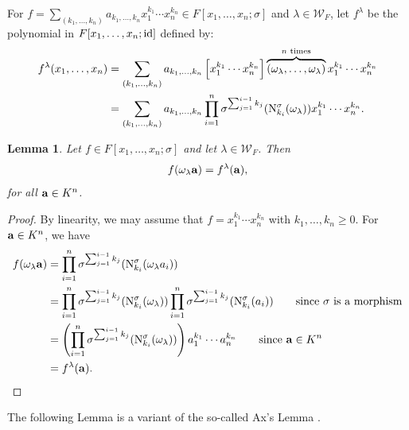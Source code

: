 \documentclass[11pt,reqno]{amsart}
\newtheorem{lem}[thm]{Lemma}
\theoremstyle{definition}
\begin{document}
\noindent
For $f=\sum_{(k_1,\dots,k_n)} a_{k_1,\dots,k_n}x_1^{k_1}\cdots x_n^{k_n} \in F[x_1,\dots,x_n;\sigma]$ and $\lambda \in \mathscr{W}_F$, let $f^\lambda$ be the polynomial in $F[x_1,\dots,x_n;{\rm id}]$ defined by:
\begin{align*}
f^{\lambda}(x_1,\dots,x_n)&=\sum_{(k_1,\dots,k_n)}a_{k_1,\dots,k_n}\left[x_1^{k_1}\cdots  x_n^{k_n}\right]\overbrace{\left(\omega_\lambda,\dots,\omega_\lambda\right)}^{n\,\,\textrm{times}}x_1^{k_1}\cdots  x_n^{k_n}\\
&=\sum_{(k_1,\dots,k_n)}a_{k_1,\dots,k_n}\prod_{i=1}^n \sigma^{\sum_{j=1}^{i-1}k_j}({\rm N}^\sigma_{k_i}(\omega_\lambda))x_1^{k_1}\cdots  x_n^{k_n}.
\end{align*}
\begin{lem}\label{lem:resttoflam}
Let $f \in F[x_1,\dots,x_n;\sigma]$ and let $\lambda \in \mathscr{W}_F$. Then 
$$
f(\omega_\lambda {\bf a})=f^{\lambda}({\bf a}),
$$ for all ${\bf a} \in K^n$.
\end{lem}
\begin{proof}
By linearity, we may assume that $f=x_1^{k_1}\cdots x_n^{k_n}$ with $k_1,\dots,k_n \geq 0$. For ${\bf a} \in K^n$, we have
\begin{align*}
f(\omega_\lambda {\bf a})&=\prod_{i=1}^n \sigma^{\sum_{j=1}^{i-1}k_j}({\rm N}^\sigma_{k_i}(\omega_\lambda a_i))\\
&=\prod_{i=1}^n \sigma^{\sum_{j=1}^{i-1}k_j}({\rm N}^\sigma_{k_i}(\omega_\lambda))\prod_{i=1}^n \sigma^{\sum_{j=1}^{i-1}k_j}({\rm N}^\sigma_{k_i}(a_i))\quad\quad\textrm{since}\,\, \sigma\,\,\textrm{is a morphism}\\
&=\left(\prod_{i=1}^n \sigma^{\sum_{j=1}^{i-1}k_j}({\rm N}^\sigma_{k_i}(\omega_\lambda))\right)  a_1^{k_1}\cdots a_n^{k_n}\quad\quad\textrm{since}\,\, {\bf a} \in K^n\\
&=f^\lambda({\bf a}).
\end{align*}
\end{proof}

The following Lemma is a variant of the so-called Ax's Lemma \cite[Lemma 1.2]{CT24}.
\end{document}
